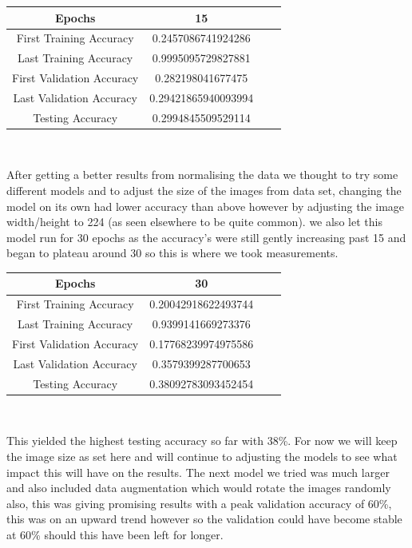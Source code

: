 \begin{table}[H]
\begin{center}
 \footnotesize
 \begin{tabular}{|c||c|c|c|}
 \hline
 Epochs & 15 \\
 \hline \hline
 First Training Accuracy & 0.2457086741924286 \\
 \hline
 Last Training Accuracy & 0.9995095729827881 \\
 \hline
 First Validation Accuracy & 0.282198041677475 \\
 \hline
 Last Validation Accuracy & 0.29421865940093994 \\
 \hline
 Testing Accuracy & 0.2994845509529114 \\
 \hline
 \end{tabular} \\
\end{center}
\end{table}

After getting a better results from normalising the data we thought to try some different models and to adjust the size of the images from data set, changing the model on its own had lower accuracy than above however by adjusting the image width/height to 224 (as seen elsewhere to be quite common). we also let this model run for 30 epochs as the accuracy's were still gently increasing past 15 and began to plateau around 30 so this is where we took measurements. \\

\begin{table}[H]
\begin{center}
 \footnotesize
 \begin{tabular}{|c||c|c|c|}
 \hline
 Epochs & 30 \\
 \hline \hline
 First Training Accuracy & 0.20042918622493744 \\
 \hline
 Last Training Accuracy & 0.9399141669273376 \\
 \hline
 First Validation Accuracy & 0.17768239974975586 \\
 \hline
 Last Validation Accuracy & 0.3579399287700653 \\
 \hline
 Testing Accuracy & 0.38092783093452454 \\
 \hline
 \end{tabular} \\
\end{center}
\end{table}

This yielded the highest testing accuracy so far with 38\%. For now we will keep the image size as set here and will continue to adjusting the models to see what impact this will have on the results. The next model we tried was much larger and also included data augmentation which would rotate the images randomly also, this was giving promising results with a peak validation accuracy of 60\%, this was on an upward trend however so the validation could have become stable at 60\% should this have been left for longer. \\

